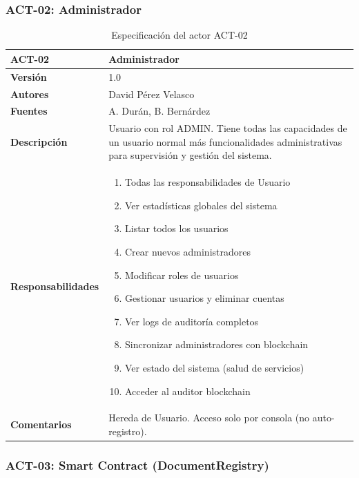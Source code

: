 \documentclass[11pt, a4paper]{article}
\begin{document}
\subsubsection{ACT-02: Administrador}

\begin{table}[H]
    \centering
    \small
    \begin{tabular}{|p{4cm}|p{10cm}|}
    \hline
    \textbf{ACT-02} & Administrador \\
    \hline
    \textbf{Versión} & 1.0 \\
    \hline
    \textbf{Autores} & David Pérez Velasco \\
    \hline
    \textbf{Fuentes} & A. Durán, B. Bernárdez \\
    \hline
    \textbf{Descripción} & Usuario con rol ADMIN. Tiene todas las capacidades de un usuario normal más funcionalidades administrativas para supervisión y gestión del sistema. \\
    \hline
    \textbf{Responsabilidades} & 
    \begin{enumerate}
        \item Todas las responsabilidades de Usuario
        \item Ver estadísticas globales del sistema
        \item Listar todos los usuarios
        \item Crear nuevos administradores
        \item Modificar roles de usuarios
        \item Gestionar usuarios y eliminar cuentas
        \item Ver logs de auditoría completos
        \item Sincronizar administradores con blockchain
        \item Ver estado del sistema (salud de servicios)
        \item Acceder al auditor blockchain
    \end{enumerate} \\
    \hline
    \textbf{Comentarios} & Hereda de Usuario. Acceso solo por consola (no auto-registro). \\
    \hline
    \end{tabular}
    \caption{Especificación del actor ACT-02}
\end{table}

\subsubsection{ACT-03: Smart Contract (DocumentRegistry)}
\end{document}
